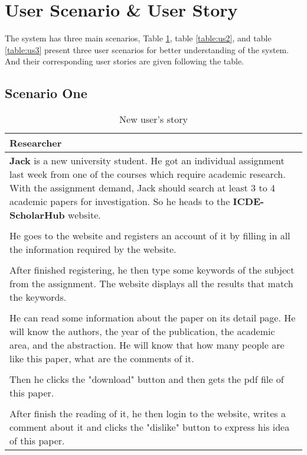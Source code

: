 \section{User Scenario \& User Story}

\noindent
The system has three main scenarios,
Table \ref{table:us1}, table \ref{table:us2}, and table \ref{table:us3} present three user scenarios
for better understanding of the system. And their corresponding user stories are given following the table.

\subsection*{Scenario One}

\begin{table}[!ht]
	\renewcommand{\arraystretch}{1.2}
	\centering
	\begin{tabular}{ p{14cm} }
		\hline
		\textbf{Researcher}                                                            \\
		\hline
		\textbf{Jack} is a new university student. He got an individual assignment last week
		from one of the courses which require  academic research. With the assignment demand,
		Jack should search at least 3 to 4 academic papers for investigation. So he heads to
		the \textbf{ICDE-ScholarHub} website.                                          \\
		\\
		He goes to the website and registers an account of it by filling in all the information
		required by the website.                                                       \\
		\\
		After finished registering, he then type some keywords of the subject from the assignment.
		The website displays all the results that match the keywords.                  \\
		\\
		He can read some information about the paper on its detail page. He will know the authors,
		the year of the publication, the academic area, and the abstraction. He will know that
		how many people are like this paper, what are the comments of it.              \\
		\\
		Then he clicks the "download" button and then gets the pdf file of this paper. \\
		\\
		After finish the reading of it, he then login to the website, writes a comment about it
		and clicks the "dislike" button to express his idea of this paper.             \\
		\hline
	\end{tabular}
	\caption{New user's story}
	\label{table:us1}
\end{table}

